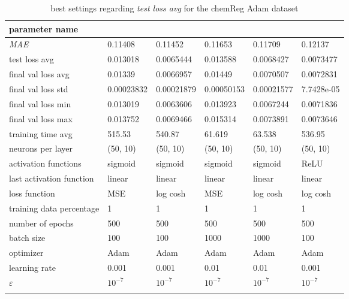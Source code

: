 \begin{longtable}{|l|>{\columncolor{bestColumnColor}}l|l|l|l|l|}
\hline
\textbf{parameter name} & \multicolumn{5}{c|}{\textbf{best values}} \\
\hline
\textit{MAE}             & 0.11408 & 0.11452 & 0.11653 & 0.11709 & 0.12137 \\
test loss avg            & 0.013018 & 0.0065444 & 0.013588 & 0.0068427 & 0.0073477 \\
final val loss avg       & 0.01339 & 0.0066957 & 0.01449 & 0.0070507 & 0.0072831 \\
final val loss std       & 0.00023832 & 0.00021879 & 0.00050153 & 0.00021577 & 7.7428e-05 \\
final val loss min       & 0.013019 & 0.0063606 & 0.013923 & 0.0067244 & 0.0071836 \\
final val loss max       & 0.013752 & 0.0069466 & 0.015314 & 0.0073891 & 0.0073646 \\
training time avg        & 515.53  & 540.87  & 61.619  & 63.538  & 536.95  \\
{\color{equalParamColor} neurons per layer } & {\color{equalParamColor} (50, 10) } & {\color{equalParamColor} (50, 10) } & {\color{equalParamColor} (50, 10) } & {\color{equalParamColor} (50, 10) } & {\color{equalParamColor} (50, 10) } \\
activation functions     & sigmoid & sigmoid & sigmoid & sigmoid & ReLU    \\
{\color{equalParamColor} last activation function } & {\color{equalParamColor} linear } & {\color{equalParamColor} linear } & {\color{equalParamColor} linear } & {\color{equalParamColor} linear } & {\color{equalParamColor} linear } \\
loss function            & MSE     & log cosh & MSE     & log cosh & log cosh \\
{\color{equalParamColor} training data percentage } & {\color{equalParamColor} 1 } & {\color{equalParamColor} 1 } & {\color{equalParamColor} 1 } & {\color{equalParamColor} 1 } & {\color{equalParamColor} 1 } \\
{\color{equalParamColor} number of epochs } & {\color{equalParamColor} 500 } & {\color{equalParamColor} 500 } & {\color{equalParamColor} 500 } & {\color{equalParamColor} 500 } & {\color{equalParamColor} 500 } \\
batch size               & 100     & 100     & 1000    & 1000    & 100     \\
{\color{equalParamColor} optimizer } & {\color{equalParamColor} Adam } & {\color{equalParamColor} Adam } & {\color{equalParamColor} Adam } & {\color{equalParamColor} Adam } & {\color{equalParamColor} Adam } \\
learning rate            & 0.001   & 0.001   & 0.01    & 0.01    & 0.001   \\
{\color{equalParamColor} $\varepsilon$ } & {\color{equalParamColor} $10^{-7}$ } & {\color{equalParamColor} $10^{-7}$ } & {\color{equalParamColor} $10^{-7}$ } & {\color{equalParamColor} $10^{-7}$ } & {\color{equalParamColor} $10^{-7}$ } \\
\hline

\caption{best settings regarding \textit{test loss avg} for the chemReg Adam dataset}
\label{table:test_loss_avg_best_chemreg_adam}
\end{longtable}
